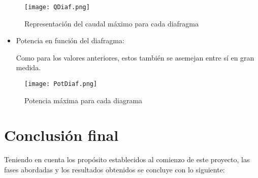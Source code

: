 \begin{figure}
\centering
\texttt{[image: QDiaf.png]}
\caption{Representación del caudal máximo para cada diafragma}
\label{fig:QDiaf}
\end{figure}

\begin{itemize}
\item
  Potencia en función del diafragma:

  Como para los valores anteriores, estos también se asemejan entre sí
  en gran medida.
\end{itemize}

\begin{figure}
\centering
\texttt{[image: PotDiaf.png]}
\caption{Potencia máxima para cada diagrama}
\label{fig:PotDiaf}
\end{figure}

\section{Conclusión final}\label{sec:conclusion}

Teniendo en cuenta los propósito establecidos al comienzo de este
proyecto, las fases abordadas y los resultados obtenidos se concluye con
lo siguiente:

